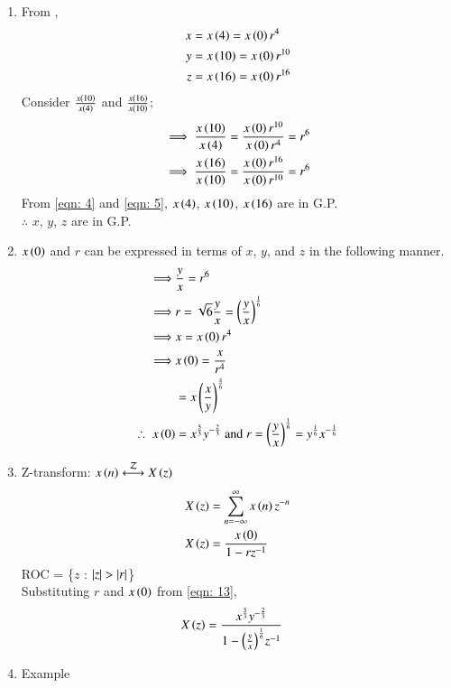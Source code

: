 \documentclass[journal,12pt,twocolumn]{IEEEtran}
\theoremstyle{remark}
\begin{document}
\begin{enumerate}
\item From ,
\begin{align}
    x&= x\left(4\right) =x\left(0\right)r^4 \\
 y&=x\left(10\right)=x\left(0\right)r^{10} \\
 z&=x\left(16\right)=x\left(0\right)r^{16}
\end{align}
Consider $\frac{x\left(10\right)}{x\left(4\right)}$ and $\frac{x\left(16\right)}{x\left(10\right)}$;
\begin{align}
 \implies\frac{x\left(10\right)}{x\left(4\right)} &= \frac{x\left(0\right)r^{10}}{x\left(0\right)r^4} = r^6 \label{eqn: 4}\\ 
 \implies\frac{x\left(16\right)}{x\left(10\right)} &= \frac{x\left(0\right)r^{16}}{x\left(0\right)r^{10}} = r^6\label{eqn: 5}
\end{align}
From \eqref{eqn: 4} and \eqref{eqn: 5}, $x\left(4\right)$, $x\left(10\right)$, $x\left(16\right)$ are in G.P.\\
$\therefore$  $x$, $y$, $z$ are in G.P.\\
\item
$x\left(0\right)$ and $r$ can be expressed in terms of $x$, $y$, and $z$ in the following manner.
\begin{align}
    \implies&\frac{y}{x}=r^6 \\
 \implies& r=\sqrt{6}{\frac{y}{x}}=\left(\frac{y}{x}\right)^{\frac{1}{6}}\\
    \implies&  x=x\left(0\right)r^4 \\
    \implies& x\left(0\right)=\frac{x}{r^4}\\
    &=x\left(\frac{x}{y}\right)^{\frac{4}{6}}\\
 \therefore\; x\left(0\right)&=x^{\frac{5}{3}}y^{-\frac{2}{3}}\;
 \text{and}\; r=\left(\frac{y}{x}\right)^{\frac{1}{6}}= y^{\frac{1}{6}}x^{-\frac{1}{6}} \label{eqn: 13}
\end{align}
\item 
Z-transform:    $x\brak{n} \system{Z} X\brak{z}$
\begin{align}
    X\left(z\right)&= \sum_{n=-\infty}^{\infty} x\left(n\right)z^{-n}\\
    X\left(z\right)&=\frac{x\left(0\right)}{1-rz^{-1}}
\end{align}
ROC = \{$z$ : $\left\vert z\right\vert>\left\vert r\right\vert$\}\\
Substituting $r$ and $x\left(0\right)$ from \eqref{eqn: 13}, 
\begin{align}
     X\left(z\right)&=\frac{x^{\frac{5}{3}}y^{-\frac{2}{3}}}{1-{\left(\frac{y}{x}\right)^{\frac{1}{6}}}z^{-1}}
\end{align}
\item Example 

\end{enumerate}
\end{document}
